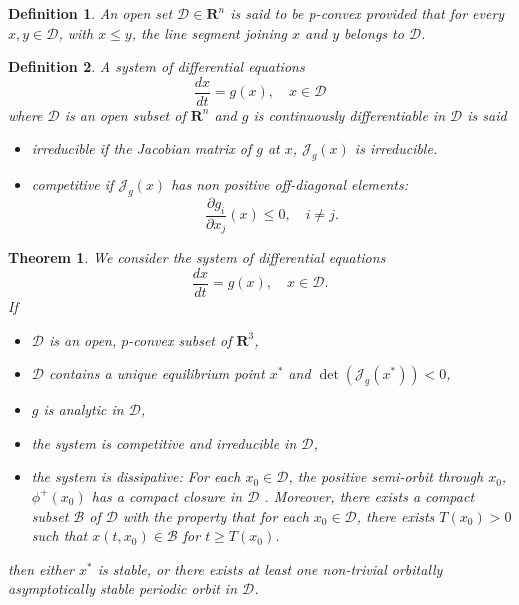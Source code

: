 \documentclass{article}
\newtheorem{theorem}{Theorem}
\newtheorem{definition}{Definition}
\begin{document}
\begin{definition}
An open set $\mathcal{D} \in \mathbf{R}^n$ is said to be p-convex provided that for every $x, y \in \mathcal{D}$, with $x \leq y$, the line segment joining $x$ and $y$ belongs to $\mathcal{D}$.
\end{definition}

\begin{definition}\cite{smith_monotone_1995}
A system of differential equations
$$ \dfrac{d x}{dt} = g(x), \quad x \in \mathcal{D}$$
where $\mathcal{D}$ is an open subset of $\mathbf{R}^n$ and $g$ is continuously differentiable in $\mathcal{D}$ is said 

\begin{itemize}
\item irreducible if the Jacobian matrix of $g$ at $x$, $\mathcal{J}_g(x)$ is irreducible.
\item competitive if $\mathcal{J}_g(x)$ has non positive off-diagonal elements:
$$ \dfrac{\partial g_i}{\partial x_j}(x) \leq 0, \quad i \neq j.
$$
\end{itemize}

\end{definition}



\begin{theorem}\cite{zhu_stable_1994}\label{theorem: periodicASOrbit}
We consider the system of differential equations
$$
\dfrac{dx}{dt} = g(x), \quad x \in \mathcal{D}.
$$
If
\begin{itemize}
\item $\mathcal{D}$ is an open, $p$-convex subset of $\mathbf{R}^3$,
\item $\mathcal{D}$ contains a unique equilibrium point $x^*$ and $\det(\mathcal{J}_g(x^*)) < 0$,
\item $g$ is analytic in $\mathcal{D}$,
\item the system is competitive and irreducible in $\mathcal{D}$,
\item the system is dissipative: For each $x_0 \in \mathcal{D}$, the positive semi-orbit through $x_0$, $\phi^+(x_0)$ has a compact closure in $\mathcal{D}$ . Moreover, there exists a compact subset $\mathcal{B}$ of $\mathcal{D}$ with the property that for each $x_0 \in \mathcal{D}$, there exists $T(x_0) > 0$ such that $x(t, x_0) \in \mathcal{B}$ for $t \geq T(x_0)$.
\end{itemize}

then either $x^*$ is stable, or there exists at least one non-trivial orbitally asymptotically stable  periodic orbit in $\mathcal{D}$.
\end{theorem}
\end{document}
